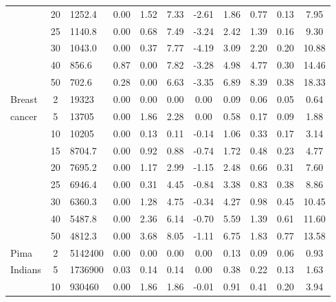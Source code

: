 {\begin{longtable}{@{}lclcccccccc@{}}
                      & 20 & 1252.4          & 0.00    & 1.52  & 7.33  & -2.61 & 1.86    & 0.77 & 0.13 & 7.95  \\
                      & 25 & 1140.8          & 0.00    & 0.68  & 7.49  & -3.24 & 2.42    & 1.39 & 0.16 & 9.30  \\
                      & 30 & 1043.0          & 0.00    & 0.37  & 7.77  & -4.19 & 3.09    & 2.20 & 0.20 & 10.88 \\
                      & 40 & 856.6           & 0.87    & 0.00  & 7.82  & -3.28 & 4.98    & 4.77 & 0.30 & 14.46 \\
                      & 50 & 702.6           & 0.28    & 0.00  & 6.63  & -3.35 & 6.89    & 8.39 & 0.38 & 18.33 \\
Breast                & 2  & 19323           & 0.00    & 0.00  & 0.00  & 0.00  & 0.09    & 0.06 & 0.05 & 0.64  \\
cancer                & 5  & 13705           & 0.00    & 1.86  & 2.28  & 0.00  & 0.58    & 0.17 & 0.09 & 1.88  \\
                      & 10 & 10205           & 0.00    & 0.13  & 0.11  & -0.14 & 1.06    & 0.33 & 0.17 & 3.14  \\
                      & 15 & 8704.7          & 0.00    & 0.92  & 0.88  & -0.74 & 1.72    & 0.48 & 0.23 & 4.77  \\
                      & 20 & 7695.2          & 0.00    & 1.17  & 2.99  & -1.15 & 2.48    & 0.66 & 0.31 & 7.60  \\
                      & 25 & 6946.4          & 0.00    & 0.31  & 4.45  & -0.84 & 3.38    & 0.83 & 0.38 & 8.86  \\
                      & 30 & 6360.3          & 0.00    & 1.28  & 4.75  & -0.34 & 4.27    & 0.98 & 0.45 & 10.45 \\
                      & 40 & 5487.8          & 0.00    & 2.36  & 6.14  & -0.70 & 5.59    & 1.39 & 0.61 & 11.60 \\
                      & 50 & 4812.3          & 0.00    & 3.68  & 8.05  & -1.11 & 6.75    & 1.83 & 0.77 & 13.58 \\
Pima                  & 2  & 5142400         & 0.00    & 0.00  & 0.00  & 0.00  & 0.13    & 0.09 & 0.06 & 0.93  \\
Indians               & 5  & 1736900         & 0.03    & 0.14  & 0.14  & 0.00  & 0.38    & 0.22 & 0.13 & 1.63  \\
                      & 10 & 930460          & 0.00    & 1.86  & 1.86  & -0.01 & 0.91    & 0.41 & 0.20 & 3.94  \\

\end{longtable}}
